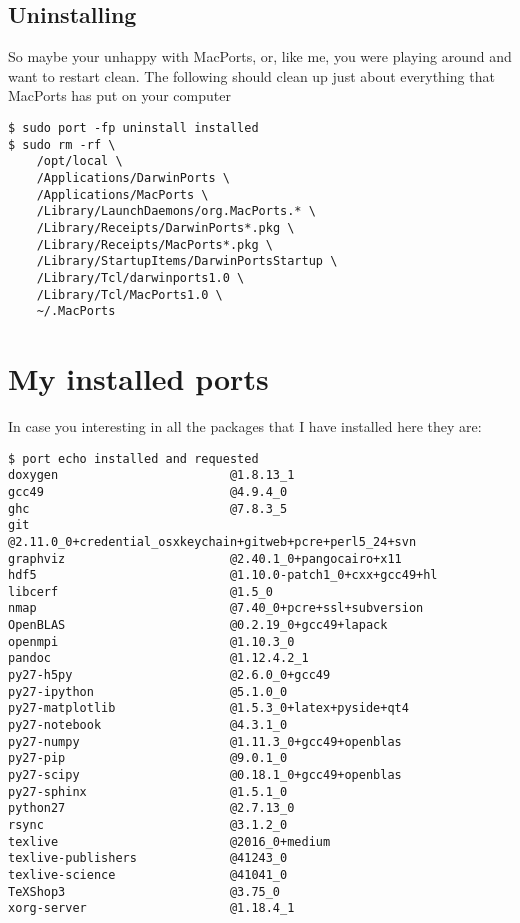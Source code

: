 \documentclass[11pt]{article}
\begin{document}
\subsection{Uninstalling}
So maybe your unhappy with MacPorts, or, like me, you were playing around and want to restart clean. The following should clean up just about everything that MacPorts has put on your computer
\begin{lstlisting}[style=Bash]
$ sudo port -fp uninstall installed
$ sudo rm -rf \
    /opt/local \
    /Applications/DarwinPorts \
    /Applications/MacPorts \
    /Library/LaunchDaemons/org.MacPorts.* \
    /Library/Receipts/DarwinPorts*.pkg \
    /Library/Receipts/MacPorts*.pkg \
    /Library/StartupItems/DarwinPortsStartup \
    /Library/Tcl/darwinports1.0 \
    /Library/Tcl/MacPorts1.0 \
    ~/.MacPorts
\end{lstlisting}



%
%
\appendix

\section{My installed ports}

In case you interesting in all the packages that I have installed here they are:
\begin{lstlisting}[style=Bash]
$ port echo installed and requested
doxygen                        @1.8.13_1 
gcc49                          @4.9.4_0 
ghc                            @7.8.3_5 
git                            @2.11.0_0+credential_osxkeychain+gitweb+pcre+perl5_24+svn 
graphviz                       @2.40.1_0+pangocairo+x11 
hdf5                           @1.10.0-patch1_0+cxx+gcc49+hl 
libcerf                        @1.5_0 
nmap                           @7.40_0+pcre+ssl+subversion 
OpenBLAS                       @0.2.19_0+gcc49+lapack 
openmpi                        @1.10.3_0 
pandoc                         @1.12.4.2_1 
py27-h5py                      @2.6.0_0+gcc49 
py27-ipython                   @5.1.0_0 
py27-matplotlib                @1.5.3_0+latex+pyside+qt4 
py27-notebook                  @4.3.1_0 
py27-numpy                     @1.11.3_0+gcc49+openblas 
py27-pip                       @9.0.1_0 
py27-scipy                     @0.18.1_0+gcc49+openblas 
py27-sphinx                    @1.5.1_0 
python27                       @2.7.13_0 
rsync                          @3.1.2_0 
texlive                        @2016_0+medium 
texlive-publishers             @41243_0 
texlive-science                @41041_0 
TeXShop3                       @3.75_0 
xorg-server                    @1.18.4_1 
\end{lstlisting}
\end{document}
